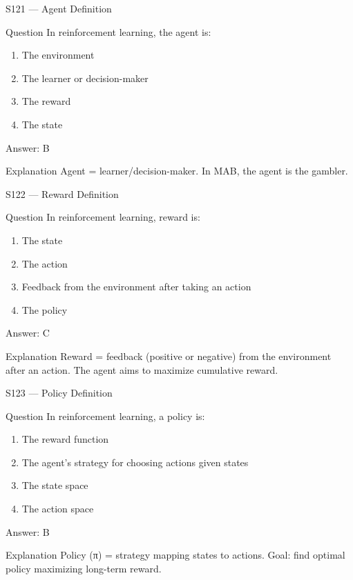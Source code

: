 \documentclass[aspectratio=169,8pt]{beamer}
\begin{document}
	\begin{frame}{S121 --- Agent Definition}
		\begin{block}{Question}
			In reinforcement learning, the agent is:
			\begin{enumerate}
				\item The environment
				\item The learner or decision-maker
				\item The reward
				\item The state
			\end{enumerate}
		\end{block}
		\begin{exampleblock}{Answer: B}\end{exampleblock}
		\begin{block}{Explanation}
			Agent = learner/decision-maker. In MAB, the agent is the gambler.
		\end{block}
	\end{frame}
	
	\begin{frame}{S122 --- Reward Definition}
		\begin{block}{Question}
			In reinforcement learning, reward is:
			\begin{enumerate}
				\item The state
				\item The action
				\item Feedback from the environment after taking an action
				\item The policy
			\end{enumerate}
		\end{block}
		\begin{exampleblock}{Answer: C}\end{exampleblock}
		\begin{block}{Explanation}
			Reward = feedback (positive or negative) from the environment after an action. The agent aims to maximize cumulative reward.
		\end{block}
	\end{frame}
	
	\begin{frame}{S123 --- Policy Definition}
		\begin{block}{Question}
			In reinforcement learning, a policy is:
			\begin{enumerate}
				\item The reward function
				\item The agent's strategy for choosing actions given states
				\item The state space
				\item The action space
			\end{enumerate}
		\end{block}
		\begin{exampleblock}{Answer: B}\end{exampleblock}
		\begin{block}{Explanation}
			Policy (π) = strategy mapping states to actions. Goal: find optimal policy maximizing long-term reward.
		\end{block}
	\end{frame}
	
\end{document}
